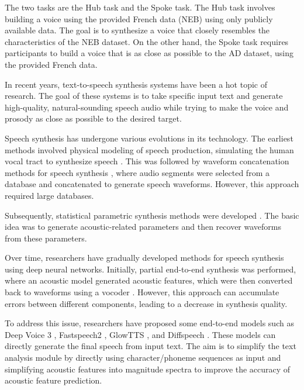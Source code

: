 \documentclass{INTERSPEECH2023}
\begin{document}
The two tasks are the Hub task and the Spoke task. The Hub task involves building a voice using the provided French data (NEB) using only publicly available data. The goal is to synthesize a voice that closely resembles the characteristics of the NEB dataset. On the other hand, the Spoke task requires participants to build a voice that is as close as possible to the AD dataset, using the provided French data.

In recent years, text-to-speech synthesis systems have been a hot topic of research.  The goal of these systems is to take specific input text and generate high-quality, natural-sounding speech audio while trying to make the voice and prosody as close as possible to the desired target.

Speech synthesis has undergone various evolutions in its technology. The earliest methods involved physical modeling of speech production, simulating the human vocal tract to synthesize speech \cite{1454423,shadle2001prospects}. This was followed by waveform concatenation methods for speech synthesis \cite{1170350,black1998festival}, where audio segments were selected from a database and concatenated to generate speech waveforms. However, this approach required large databases.

Subsequently, statistical parametric synthesis methods were developed \cite{yoshimura1999simultaneous}. The basic idea was to generate acoustic-related parameters and then recover waveforms from these parameters. 

Over time, researchers have gradually developed methods for speech synthesis using deep neural networks. Initially, partial end-to-end synthesis was performed, where an acoustic model \cite{wang2017tacotron,ren2019fastspeech,li2019neural} generated acoustic features, which were then converted back to waveforms using a vocoder \cite{oord2016wavenet,valin2019lpcnet,kong2020hifi}. However, this approach can accumulate errors between different components, leading to a decrease in synthesis quality.

To address this issue, researchers have proposed some end-to-end models such as Deep Voice 3 \cite{ping2017deep}, Fastspeech2 \cite{ren2020fastspeech}, GlowTTS \cite{kim2020glow}, and Diffspeech \cite{jeong2021diff}. These models can directly generate the final speech from input text. The aim is to simplify the text analysis module by directly using character/phoneme sequences as input and simplifying acoustic features into magnitude spectra to improve the accuracy of acoustic feature prediction.
\end{document}

